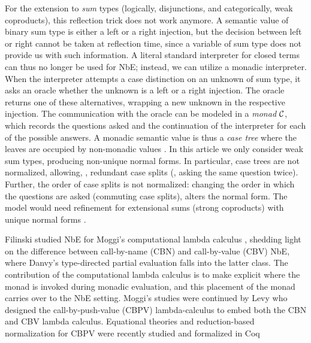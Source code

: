 \documentclass[sigplan,screen,fleqn,review]{acmart} %
\begin{document}
For the extension to \emph{sum} types (logically, disjunctions, and categorically,
weak coproducts), this reflection trick does not work anymore.  A
semantic value of binary sum type is either a left or a right
injection, but the decision between left or right cannot be taken at
reflection time, since a variable of sum type does not provide us with
such information.  A literal standard interpreter for closed terms can
thus no longer be used for NbE;  instead, we can utilize a monadic
interpreter.  When the interpreter attempts a case distinction on an
unknown of sum type, it asks an oracle whether the unknown is a left
or a right injection.  The oracle returns one of these alternatives,
wrapping a new unknown in the respective injection.  The communication with the
oracle can be modeled in a \emph{monad} $\mathcal{C}$,
which records the questions asked and the continuation of the
interpreter for each of the possible answers.
A monadic semantic value is thus a \emph{case tree} where the leaves
are occupied by non-monadic values \cite{altenkirchUustalu:flops04}.
In this article we only consider weak sum types, producing non-unique
normal forms.  In particular, case trees are not normalized, allowing,
\eg, redundant case splits (\ie, asking the same question twice).
Further, the order of case splits is not normalized: changing the
order in which the questions are asked (commuting case splits),
alters the normal form.
The model would need refinement for extensional sums (strong
coproducts) with unique normal forms
\cite{altenkirchDybjerHofmannScott:lics01,altenkirchUustalu:flops04,balatDiCosmoFiore:popl04,barral:PhD,scherer:popl17}.

Filinski \cite{filinski:tlca01} studied NbE for Moggi's computational lambda
calculus \cite{moggi:infcomp91}, shedding light on the difference
between call-by-name (CBN) and call-by-value (CBV) NbE, where Danvy's
type-directed partial evaluation \cite{danvy:popl96} falls into the
latter class.  The contribution of the computational lambda calculus
is to make explicit where the monad is invoked during monadic
evaluation, and this placement of the monad carries over to the NbE
setting.  Moggi's studies were continued by Levy \cite{levy:hosc06}
who designed the call-by-push-value (CBPV) lambda-calculus to embed
both the CBN and CBV lambda calculus.  Equational theories and
reduction-based normalization for CBPV were recently studied and
formalized in Coq~\cite{rizkallahGarbuzovZdancewic:itp18,forsterSchaeferSpiesStark:cpp19}
\end{document}
